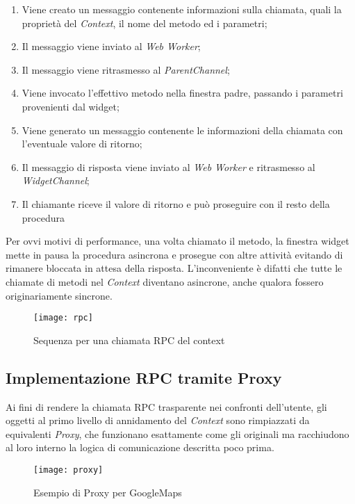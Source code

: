 \begin{enumerate}
  \item Viene creato un messaggio contenente informazioni sulla chiamata, quali la proprietà del \textit{Context}, il nome del metodo ed i parametri;
  \item Il messaggio viene inviato al \textit{Web Worker};
  \item Il messaggio viene ritrasmesso al \textit{ParentChannel};
  \item Viene invocato l'effettivo metodo nella finestra padre, passando i parametri provenienti dal widget;
  \item Viene generato un messaggio contenente le informazioni della chiamata con l'eventuale valore di ritorno;
  \item Il messaggio di risposta viene inviato al \textit{Web Worker} e ritrasmesso al \textit{WidgetChannel};
  \item Il chiamante riceve il valore di ritorno e può proseguire con il resto della procedura
\end{enumerate}

Per ovvi motivi di performance, una volta chiamato il metodo, la finestra widget mette in pausa la procedura asincrona e prosegue con altre attività evitando di rimanere bloccata in attesa della risposta. L'inconveniente è difatti che tutte le chiamate di metodi nel \textit{Context} diventano asincrone, anche qualora fossero originariamente sincrone.

\begin{figure}[H] 
  \centering 
  \texttt{[image: rpc]} 
  \caption{Sequenza per una chiamata RPC del context}
\end{figure}


\subsection{Implementazione RPC tramite Proxy}

Ai fini di rendere la chiamata RPC trasparente nei confronti dell'utente, gli oggetti al primo livello di annidamento del \textit{Context} sono rimpiazzati da equivalenti \textit{Proxy}, che funzionano esattamente come gli originali ma racchiudono al loro interno la logica di comunicazione descritta poco prima.

\begin{figure}[H] 
  \centering 
  \texttt{[image: proxy]} 
  \caption{Esempio di Proxy per GoogleMaps}
\end{figure}
